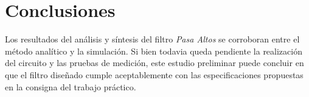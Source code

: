 \section*{Conclusiones}
\vspace{2ex}
Los resultados del an\'alisis y s\'intesis del filtro \textit{Pasa Altos} se corroboran entre el m\'etodo anal\'itico y la simulaci\'on. Si bien todavia queda pendiente la realizaci\'on del circuito y las pruebas de medici\'on, este estudio preliminar puede concluir en que el filtro diseñado cumple aceptablemente con las especificaciones propuestas en la consigna del trabajo pr\'actico.

